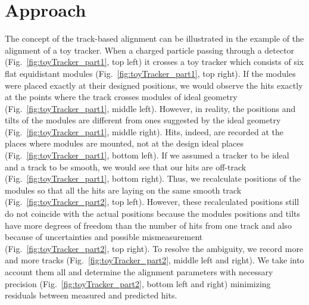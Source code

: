 \section{Approach}
\label{sec:alignmentAlg}


The concept of the track-based alignment can be illustrated in the example of the alignment of a toy tracker. When a charged particle passing through a detector (Fig.~\ref{fig:toyTracker_part1}, top left) it crosses a toy tracker which consists of six flat equidistant modules (Fig.~\ref{fig:toyTracker_part1}, top right). If the modules were placed exactly at their designed positions, we would observe the hits exactly at the points where the track crosses modules of ideal geometry (Fig.~\ref{fig:toyTracker_part1}, middle left). However, in reality, the positions and tilts of the modules are different from ones suggested by the ideal geometry (Fig.~\ref{fig:toyTracker_part1}, middle right). Hits, indeed, are recorded at the places where modules are mounted, not at the design ideal places (Fig.~\ref{fig:toyTracker_part1}, bottom left). If we assumed a tracker to be ideal and a track to be smooth, we would see that our hits are off-track (Fig.~\ref{fig:toyTracker_part1}, bottom right). Thus, we recalculate positions of the modules so that all the hits are laying on the same smooth track (Fig.~\ref{fig:toyTracker_part2}, top left). However, these recalculated positions still do not coincide with the actual positions because the modules positions and tilts have more degrees of freedom than the number of hits from one track and also because of uncertainties and possible mismeasurement (Fig.~\ref{fig:toyTracker_part2}, top right). To resolve the ambiguity, we record more and more tracks (Fig.~\ref{fig:toyTracker_part2}, middle left and right). We take into account them all and determine the alignment parameters with necessary precision (Fig.~\ref{fig:toyTracker_part2}, bottom left and right) minimizing residuals between measured and predicted hits.

